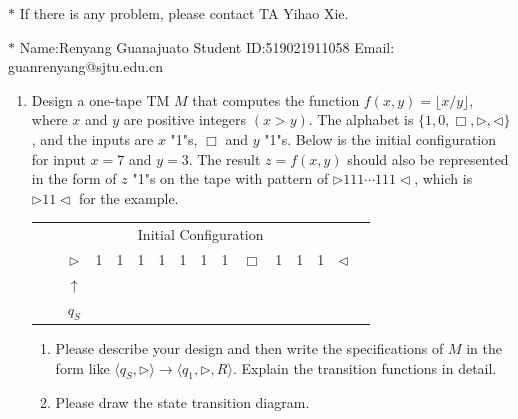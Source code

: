 \documentclass[12pt,a4paper]{article}
\theoremstyle{definition}
\begin{document}
\noindent

\noindent{}
\begin{center}
\footnotesize{\color{red}$*$ If there is any problem, please contact TA Yihao Xie. }

\footnotesize{\color{blue}$*$ Name:Renyang Guanajuato  \quad Student ID:519021911058 \quad Email: guanrenyang@sjtu.edu.cn}
\end{center}

\begin{enumerate}
    \item Design a one-tape TM $M$ that computes the function $f(x, y) = \lfloor x/y \rfloor$, where $x$ and $y$ are positive integers $(x > y)$. The alphabet is $\{1, 0, \Box, \triangleright, \triangleleft\}$, and the inputs are $x$ "1"s, $\Box$ and $y$ "1"s. Below is the initial configuration for input $x=7$ and $y=3$. The result $z=f(x,y)$ should also be represented in the form of $z$ "1"s on the tape with pattern of $\rhd 111\cdots 111\lhd$, which is $\rhd 11\lhd$ for the example.
    
	\begin{center}
		\begin{tabular}{ll|c|c|c|c|c|c|c|c|c|c|c|c|c|c}
			& \multicolumn{14}{c}{Initial Configuration}\\[5pt]
			\cline{2-16}
			& & $\triangleright$ &  1  & 1 & 1 & 1 & 1 & 1 & 1 & $\Box$ & 1 & 1 & 1 & $ \triangleleft$ & \\
			\cline{2-16}
			\multicolumn{2}{c}{} & \multicolumn{1}{c}{$\uparrow$} & \multicolumn{11}{c}{}\\[-4pt]
			\multicolumn{2}{c}{} & \multicolumn{1}{c}{$q_S$} & \multicolumn{11}{c}{}	
		\end{tabular}
	\end{center}

    \begin{enumerate}
	\item
	Please describe your design and then write the specifications of $M$ in the form like $\langle q_S, \triangleright \rangle \rightarrow \langle q_1, \triangleright,  R\rangle$. Explain the transition functions in detail.
	
	\item
	Please draw the state transition diagram.
	

\end{enumerate}
\end{enumerate}
\end{document}
